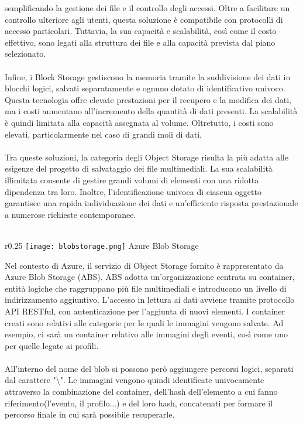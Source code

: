semplificando la gestione dei file e il controllo degli accessi. 
Oltre a facilitare un controllo ulteriore agli utenti, 
questa soluzione è compatibile con protocolli di accesso particolari. 
Tuttavia, la sua capacità e scalabilità, così come il costo effettivo, 
sono legati alla struttura dei file e alla capacità prevista dal piano selezionato.\\
\\
Infine, i Block Storage gestiscono la memoria tramite la suddivisione dei dati in blocchi logici,
salvati separatamente e ognuno dotato di identificativo univoco. 
Questa tecnologia offre elevate prestazioni per il recupero e la modifica dei dati, 
ma i costi aumentano all'incremento della quantità di dati presenti. 
La scalabilità è quindi limitata alla capacità assegnata al volume. 
Oltretutto, i costi sono elevati, particolarmente nel caso di grandi moli di dati.\\
\\
Tra queste soluzioni, 
la categoria degli Object Storage risulta la più adatta alle esigenze del progetto di salvataggio dei file multimediali. 
La sua scalabilità illimitata consente di gestire grandi volumi di elementi 
con una ridotta dipendenza tra loro. 
Inoltre, l'identificazione univoca di ciascun oggetto garantisce una rapida individuazione dei dati e 
un'efficiente risposta prestazionale a numerose richieste contemporanee.\\
\\
\begin{wrapfigure}{r}{0.25\textwidth}
    \centering
    \texttt{[image: blobstorage.png]}
    Azure Blob Storage
\end{wrapfigure}
Nel contesto di Azure, 
il servizio di Object Storage fornito è rappresentato da Azure Blob Storage (ABS). 
ABS adotta un'organizzazione centrata su container, 
entità logiche che raggruppano più file multimediali e introducono un livello di indirizzamento aggiuntivo. 
L'accesso in lettura ai dati avviene tramite protocollo API RESTful, 
con autenticazione per l'aggiunta di nuovi elementi. 
I container creati sono relativi alle categorie per le quali le immagini vengono salvate.
Ad esempio, ci sarà un container relativo alle immagini degli eventi,
così come uno per quelle legate ai profili.\\
\\
All'interno del nome del blob si possono però aggiungere percorsi logici, 
separati dal carattere "\textbackslash".
Le immagini vengono quindi identificate univocamente attraverso la combinazione 
del container, dell'hash dell'elemento a cui fanno riferimento(l'evento, il profilo...) 
e del loro hash, concatenati per formare il percorso finale in cui sarà possibile recuperarle.\\
\\
